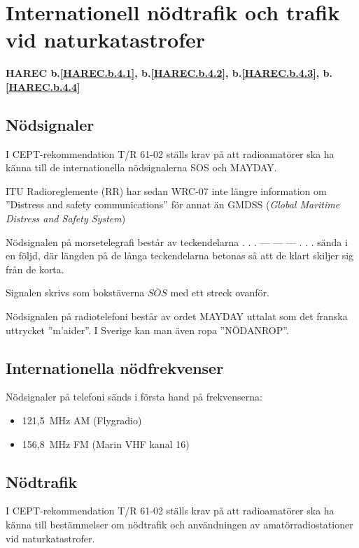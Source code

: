 \section{Internationell nödtrafik och trafik vid naturkatastrofer}
\textbf{
	HAREC b.\ref{HAREC.b.4.1}\label{myHAREC.b.4.1},
	b.\ref{HAREC.b.4.2}\label{myHAREC.b.4.2},
	b.\ref{HAREC.b.4.3}\label{myHAREC.b.4.3},
	b.\ref{HAREC.b.4.4}\label{myHAREC.b.4.4}
}

\subsection{Nödsignaler}

I CEPT-rekommendation T/R 61-02 ställs krav på att radioamatörer ska ha känna
till de internationella nödsignalerna SOS och MAYDAY.

ITU Radioreglemente (RR) har sedan WRC-07 inte längre information om
''Distress and safety communications'' för annat än GMDSS (\emph{Global Maritime Distress and Safety System})

Nödsignalen på morsetelegrafi består av teckendelarna . . . --- --- --- . . .
sända i en följd, där längden på de långa teckendelarna betonas så att de klart
skiljer sig från de korta.

Signalen skrivs som bokstäverna $\overline{SOS}$ med ett streck ovanför.

Nödsignalen på radiotelefoni består av ordet MAYDAY uttalat som det franska
uttrycket ''m'aider''. I Sverige kan man även ropa ''NÖDANROP''.

\subsection{Internationella nödfrekvenser}

Nödsignaler på telefoni sänds i första hand på frekvenserna:
\begin{itemize}
	\item 121,5~MHz AM (Flygradio)
	\item 156,8~MHz FM (Marin VHF kanal 16)
\end{itemize}

\subsection{Nödtrafik}

I CEPT-rekommendation T/R 61-02 ställs krav på att radioamatörer ska ha känna
till bestämmelser om nödtrafik och användningen av amatörradiostationer vid
naturkatastrofer.

